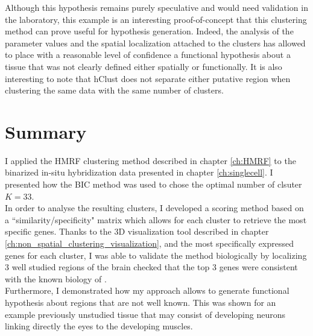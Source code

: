 	 Although this hypothesis remains purely speculative and would need validation in the laboratory, this example is an interesting proof-of-concept that this clustering method can prove useful for hypothesis generation. Indeed, the analysis of the parameter values and the spatial localization attached to the clusters has allowed to place with a reasonable level of confidence a functional hypothesis about a tissue that was not clearly defined either spatially or functionally. It is also interesting to note that hClust does not separate either putative region when clustering the same data with the same number of clusters. \\

\section{Summary}
	
I applied the HMRF clustering method described in chapter \ref{ch:HMRF} to the binarized in-situ hybridization data presented in chapter \ref{ch:singlecell}. I presented how the BIC method was used to chose the optimal number of clsuter $K = 33$.\\

In order to analyse the resulting clusters, I developed a scoring method based on a ``similarity/specificity" matrix which allows for each cluster to retrieve the most specific genes. Thanks to the 3D visualization tool described in chapter \ref{ch:non_spatial_clustering_visualization}, and the most specifically expressed genes for each cluster, I was able to validate the method biologically by localizing 3 well studied regions of the brain checked that the top 3 genes were consistent with the known biology of \platy{}.\\

Furthermore, I demonstrated how my approach allows to generate functional hypothesis about regions that are not well known. This was shown for an example previously unstudied tissue that may consist of developing neurons linking directly the eyes to the developing muscles.

